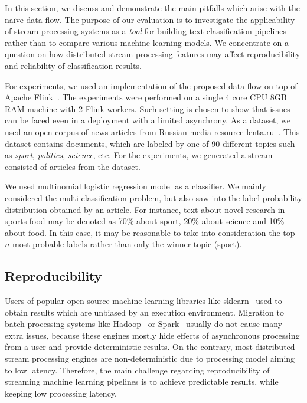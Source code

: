 \label {fs-discussion}

In this section, we discuss and demonstrate the main pitfalls which arise with the na\"ive data flow. The purpose of our evaluation is to investigate the applicability of stream processing systems as a {\em tool} for building text classification pipelines rather than to compare various machine learning models. We concentrate on a question on how distributed stream processing features may affect reproducibility and reliability of classification results.

For experiments, we used an implementation of the proposed data flow on top of Apache Flink~\cite{Carbone:2017:SMA:3137765.3137777}. The experiments were performed on a single 4 core CPU 8GB RAM machine with 2 Flink workers. Such setting is chosen to show that issues can be faced even in a deployment with a limited asynchrony. As a dataset, we used an open corpus of news articles from Russian media resource lenta.ru~\cite{lentaru}. This dataset contains documents, which are labeled by one of 90 different topics such as {\em sport}, {\em politics}, {\em science}, etc. For the experiments, we generated a stream consisted of articles from the dataset.

We used multinomial logistic regression model as a classifier. We mainly considered the multi-classification problem, but also saw into the label probability distribution obtained by an article. For instance, text about novel research in sports food may be denoted as 70\% about sport, 20\% about science and 10\% about food. In this case, it may be reasonable to take into consideration the top $n$ most probable labels rather than only the winner topic (sport).

\subsection{Reproducibility}

Users of popular open-source machine learning libraries like sklearn~\cite{sklearn_api} used to obtain results which are unbiased by an execution environment. Migration to batch processing systems like Hadoop~\cite{hadoop2009hadoop} or Spark~\cite{Zaharia:2016:ASU:3013530.2934664} usually do not cause many extra issues, because these engines mostly hide effects of asynchronous processing from a user and provide deterministic results. On the contrary, most distributed stream processing engines are non-deterministic due to processing model aiming to low latency. Therefore, the main challenge regarding reproducibility of streaming machine learning pipelines is to achieve predictable results, while keeping low processing latency.

